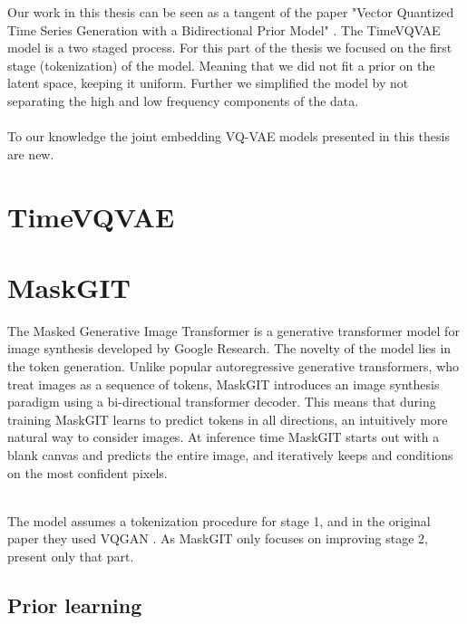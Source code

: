\documentclass[../../thesis.tex]{subfiles}
\begin{document}



Our work in this thesis can be seen as a tangent of the paper "Vector Quantized Time Series Generation with a Bidirectional Prior Model" \cite{TimeVQVAE}. The TimeVQVAE model is a two staged process. For this part of the thesis we focused on the first stage (tokenization) of the model. Meaning that we did not fit a prior on the latent space, keeping it uniform. Further we simplified the model by not separating the high and low frequency components of the data.\\\\

To our knowledge the joint embedding VQ-VAE models presented in this thesis are new.

\section{TimeVQVAE}

\section{MaskGIT}

The Masked Generative Image Transformer is a generative transformer model for image synthesis developed by Google Research. The novelty of the model lies in the token generation. Unlike popular autoregressive generative transformers, who treat images as a sequence of tokens, MaskGIT introduces an image synthesis paradigm using a bi-directional transformer decoder. This means that during training MaskGIT learns to predict tokens in all directions, an intuitively more natural way to consider images. At inference time MaskGIT starts out with a blank canvas and predicts the entire image, and iteratively keeps and conditions on the most confident pixels.\\\\


The model assumes a tokenization procedure for stage 1, and in the original paper they used VQGAN \cite{VQGAN}. As MaskGIT only focuses on improving stage 2, present only that part. 

\subsection{Prior learning}
\end{document}
